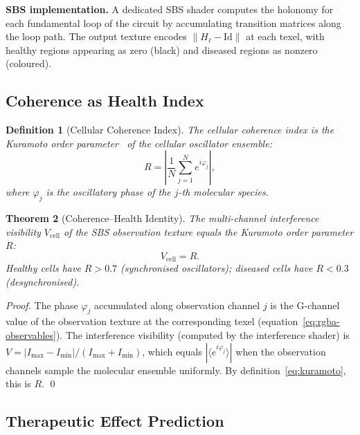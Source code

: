 \documentclass[11pt,twocolumn,a4paper]{article}
\newtheorem{theorem}{Theorem}[section]
\newtheorem{definition}[theorem]{Definition}
\begin{document}
\textbf{SBS implementation.}  A dedicated SBS shader computes the
holonomy for each fundamental loop of the circuit by accumulating
transition matrices along the loop path.  The output texture encodes
$\|H_\ell - \mathrm{Id}\|$ at each texel, with healthy regions
appearing as zero (black) and diseased regions as nonzero (coloured).

\subsection{Coherence as Health Index}

\begin{definition}[Cellular Coherence Index]
\label{def:coherence}
The \emph{cellular coherence index} is the Kuramoto order
parameter~\citep{kuramoto1975,strogatz2000,acebron2005} of the
cellular oscillator ensemble:
\begin{equation}
  R = \left| \frac{1}{N} \sum_{j=1}^{N} e^{i\varphi_j} \right|,
  \label{eq:kuramoto}
\end{equation}
where $\varphi_j$ is the oscillatory phase of the $j$-th molecular
species.
\end{definition}

\begin{theorem}[Coherence--Health Identity]
\label{thm:coherence-health}
The multi-channel interference visibility $V_{\mathrm{cell}}$ of the
SBS observation texture equals the Kuramoto order parameter $R$:
\begin{equation}
  V_{\mathrm{cell}} = R.
  \label{eq:coherence-health}
\end{equation}
Healthy cells have $R > 0.7$ (synchronised oscillators); diseased
cells have $R < 0.3$ (desynchronised).
\end{theorem}

\begin{proof}
The phase $\varphi_j$ accumulated along observation channel $j$ is
the G-channel value of the observation texture at the corresponding
texel (equation~\ref{eq:rgba-observables}).  The interference
visibility (computed by the interference shader) is
$V = |I_{\max} - I_{\min}| / (I_{\max} + I_{\min})$, which equals
$|\langle e^{i\varphi_j} \rangle|$ when the observation channels
sample the molecular ensemble uniformly.  By
definition~\eqref{eq:kuramoto}, this is $R$.  \qed
\end{proof}

\subsection{Therapeutic Effect Prediction}
\end{document}
